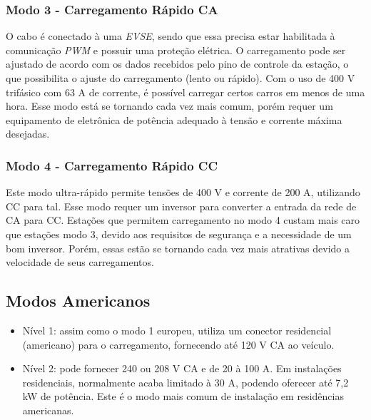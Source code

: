         \subsubsection{Modo 3 - Carregamento Rápido CA}
        \label{stateofart:modes:europe:mode3}

        O cabo é conectado à uma \textit{\ac{EVSE}}, sendo que essa precisa estar habilitada à comunicação \textit{\ac{PWM}} e possuir uma proteção elétrica. O carregamento pode ser ajustado de acordo com os dados recebidos pelo pino de controle da estação, o que possibilita o ajuste do carregamento (lento ou rápido). Com o uso de 400 V trifásico com 63 A de corrente, é possível carregar certos carros em menos de uma hora. Esse modo está se tornando cada vez mais comum, porém requer um equipamento de eletrônica de potência adequado à tensão e corrente máxima desejadas.

        \subsubsection{Modo 4 - Carregamento Rápido CC}
        \label{stateofart:modes:europe:mode4}

        Este modo ultra-rápido permite tensões de 400 V e corrente de 200 A, utilizando \ac{CC} para tal. Esse modo requer um inversor para converter a entrada da rede de \ac{CA} para \ac{CC}. Estações que permitem carregamento no modo 4 custam mais caro que estações modo 3, devido aos requisitos de segurança e a necessidade de um bom inversor. Porém, essas estão se tornando cada vez mais atrativas devido a velocidade de seus carregamentos.

    \subsection{Modos Americanos}
    \label{stateofart:modes:us}

      \begin{itemize}
        \item Nível 1: assim como o modo 1 europeu, utiliza um conector residencial (americano) para o carregamento, fornecendo até 120 V \ac{CA} ao veículo.
        \item Nível 2: pode fornecer 240 ou 208 V \ac{CA} e de 20 à 100 A. Em instalações residenciais, normalmente acaba limitado à 30 A, podendo oferecer até 7,2 kW de potência. Este é o modo mais comum de instalação em residências americanas.
      \end{itemize}

